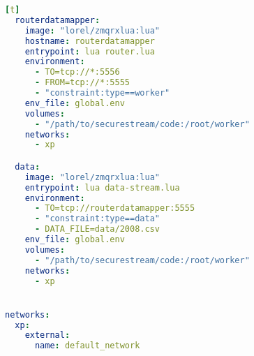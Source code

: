 \begin{lstlisting}[language=YAML,caption={Configuration file example for \textsc{Docker Compose}.},label=docker-compose-config][t]
  routerdatamapper:
    image: "lorel/zmqrxlua:lua"
    hostname: routerdatamapper
    entrypoint: lua router.lua
    environment:
      - TO=tcp://*:5556
      - FROM=tcp://*:5555
      - "constraint:type==worker"
    env_file: global.env
    volumes:
      - "/path/to/securestream/code:/root/worker"
    networks:
      - xp

  data:
    image: "lorel/zmqrxlua:lua"
    entrypoint: lua data-stream.lua
    environment:
      - TO=tcp://routerdatamapper:5555
      - "constraint:type==data"
      - DATA_FILE=data/2008.csv
    env_file: global.env
    volumes:
      - "/path/to/securestream/code:/root/worker"
    networks:
      - xp


networks:
  xp:
    external:
      name: default_network
\end{lstlisting}
